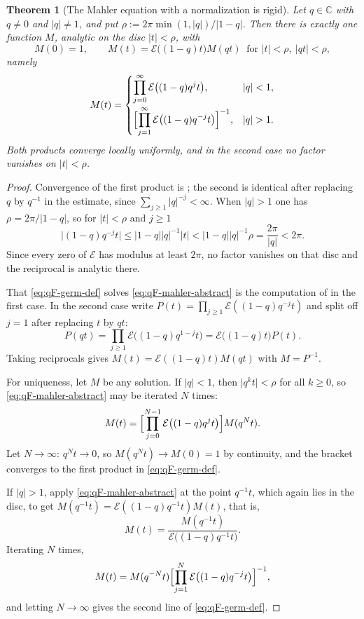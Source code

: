 \documentclass[11pt,oneside,openany]{book}
\newtheorem{theorem}{Theorem}[chapter]
\theoremstyle{definition}
\theoremstyle{remark}
\newcommand{\C}{\mathbb C}
\newcommand{\abs}[1]{\lvert #1\rvert}
\newcommand{\defeq}{\mathrel{:=}}
\begin{document}
\begin{theorem}[The Mahler equation with a normalization is rigid]\label{thm:qF-germ-uniqueness}
Let $q\in\C$ with $q\ne0$ and $\abs q\ne1$, and put
$\rho\defeq2\pi\min(1,\abs q)/\abs{1-q}$.  Then there is exactly one function
$M$, analytic on the disc $\abs t<\rho$, with
\begin{equation}\label{eq:qF-mahler-abstract}
 M(0)=1,
 \qquad
 M(t)=\mathcal E\bigl((1-q)t\bigr)M(qt)
 \ \text{ for }\abs t<\rho,\ \abs{qt}<\rho,
\end{equation}
namely
\begin{equation}\label{eq:qF-germ-def}
 M(t)=
 \begin{cases}
  \displaystyle\prod_{j=0}^{\infty}\mathcal E\bigl((1-q)q^{j}t\bigr),
  &\abs q<1,\\[12pt]
  \displaystyle\Bigl[\prod_{j=1}^{\infty}\mathcal E\bigl((1-q)q^{-j}t\bigr)\Bigr]^{-1},
  &\abs q>1.
 \end{cases}
\end{equation}
Both products converge locally uniformly, and in the second case no factor
vanishes on $\abs t<\rho$.
\end{theorem}

\begin{proof}
Convergence of the first product is ; the second
is identical after replacing $q$ by $q^{-1}$ in the estimate, since
$\sum_{j\ge1}\abs q^{-j}<\infty$.  When $\abs q>1$ one has
$\rho=2\pi/\abs{1-q}$, so for $\abs t<\rho$ and $j\ge1$
\[
 \abs{(1-q)q^{-j}t}
 \le\abs{1-q}\abs q^{-1}\abs t
 <\abs{1-q}\abs q^{-1}\rho
 =\frac{2\pi}{\abs q}<2\pi .
\]
Since every zero of $\mathcal E$ has modulus at least $2\pi$, no factor vanishes
on that disc and the reciprocal is analytic there.

That \eqref{eq:qF-germ-def} solves \eqref{eq:qF-mahler-abstract} is the
computation of  in the first case.  In the second
case write $P(t)=\prod_{j\ge1}\mathcal E((1-q)q^{-j}t)$ and split off $j=1$ after
replacing $t$ by $qt$:
\[
 P(qt)=\prod_{j\ge1}\mathcal E\bigl((1-q)q^{1-j}t\bigr)
      =\mathcal E\bigl((1-q)t\bigr)P(t).
\]
Taking reciprocals gives $M(t)=\mathcal E((1-q)t)M(qt)$ with $M=P^{-1}$.

For uniqueness, let $M$ be any solution.  If $\abs q<1$, then $\abs{q^kt}<\rho$
for all $k\ge0$, so \eqref{eq:qF-mahler-abstract} may be iterated $N$ times:
\[
 M(t)=\Bigl[\prod_{j=0}^{N-1}\mathcal E\bigl((1-q)q^{j}t\bigr)\Bigr]M(q^Nt).
\]
Let $N\to\infty$: $q^Nt\to0$, so $M(q^Nt)\to M(0)=1$ by continuity, and the
bracket converges to the first product in \eqref{eq:qF-germ-def}.

If $\abs q>1$, apply \eqref{eq:qF-mahler-abstract} at the point $q^{-1}t$, which
again lies in the disc, to get
$M(q^{-1}t)=\mathcal E((1-q)q^{-1}t)M(t)$, that is,
\[
 M(t)=\frac{M(q^{-1}t)}{\mathcal E\bigl((1-q)q^{-1}t\bigr)} .
\]
Iterating $N$ times,
\[
 M(t)=M(q^{-N}t)\Bigl[\prod_{j=1}^{N}\mathcal E\bigl((1-q)q^{-j}t\bigr)\Bigr]^{-1},
\]
and letting $N\to\infty$ gives the second line of \eqref{eq:qF-germ-def}.
\end{proof}
\end{document}
